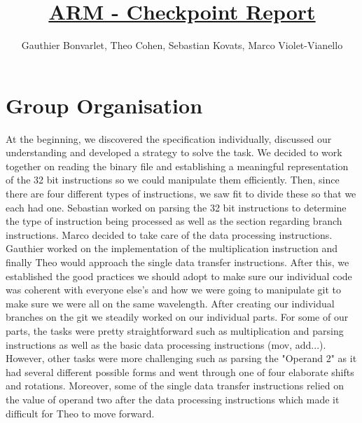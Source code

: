 \documentclass[10pt]{article}
\begin{document}
\title{\underline{ARM - Checkpoint Report}}
\author{Gauthier Bonvarlet, Theo Cohen, Sebastian Kovats, Marco Violet-Vianello}
\maketitle
\section*{Group Organisation}
\hspace*{0.6cm} At the beginning, we discovered the specification individually, discussed our understanding and developed a strategy to solve the task. We decided to work together on reading the binary file and establishing a meaningful representation of the 32 bit instructions so we could manipulate them efficiently. Then, since there are four different types of instructions, we saw fit to divide these so that we each had one. Sebastian worked on parsing the 32 bit instructions to determine the type of instruction being processed as well as the section regarding branch instructions. Marco decided to take care of the data processing instructions. Gauthier worked on the implementation of the multiplication instruction and finally Theo would approach the single data transfer instructions. \newline
\hspace*{0.6cm} After this, we established the good practices we should adopt to make sure our individual code was coherent with everyone else's and how we were going to manipulate git to make sure we were all on the same wavelength. After creating our individual branches on the git we steadily worked on our individual parts. For some of our parts, the tasks were pretty straightforward such as multiplication and parsing instructions as well as the basic data processing instructions (mov, add...). However, other tasks were more challenging such as parsing the "Operand 2" as it had several different possible forms and went through one of four elaborate shifts and rotations. Moreover, some of the single data transfer instructions relied on the value of operand two after the data processing instructions which made it difficult for Theo to move forward. \newline
\end{document}
